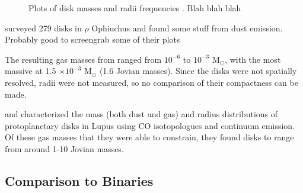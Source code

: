 \begin{figure}[h!]
  \centering
    \hspace*{\fill}%
    \hspace*{\fill}%
    \caption{Plots of disk masses and radii frequencies \citep{Eisner2018}. Blah blah blah}
    \label{fig:eisner18_disk_properties}
\end{figure}




\citet{Williams2019} surveyed 279 disks in $\rho$ Ophiuchus and found some stuff from dust emission. Probably good to screengrab some of their plots

The resulting gas masses from \citet{Miotello2017} ranged from $10^{-6}$ to $10^{-3}$ M$_\odot$, with the most massive at 1.5 $\times 10^{-3}$ M$_\odot$ (1.6 Jovian masses). Since the disks were not spatially resolved, radii were not measured, so no comparison of their compactness can be made.

\citet{Ansdell2016} and \citet{Ansdell2018} characterized the mass (both dust and gas) and radius distributions of protoplanetary disks in Lupus using CO isotopologues and continuum emission. Of these gas masses that they were able to constrain, they found disks to range from around 1-10 Jovian masses.






\subsection{Comparison to Binaries}



